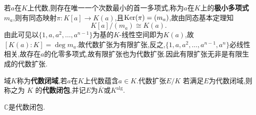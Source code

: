 \begin{definition}\label{def:minimal polynomial}
	若$a$在$K$上代数,则存在唯一一个次数最小的首一多项式,称为$a$在$K$上的\textbf{极小多项式}$m_a$,则有同态映射$\pi:K[a]\to K(a)$,且$\operatorname{\mathrm{Ker}}(\pi)=(m_a)$,故由同态基本定理知
	\[
	K[a]/(m_a)\cong K(a).
	\]
	由此可见以$\{1,a,a^2,\dots,a^{n-1}\}$为基的$K$-线性空间即为$K(a)$,故$[K(a):K]=\deg m_a$.故代数扩张为有限扩张,反之,$\{1,a,a^2,\dots,a^{n-1},a^n\}$必线性相关,故存在$a$的化零多项式,故有限扩张也为代数扩张.因此有限扩张无非是有限生成的代数扩张.
\end{definition}
\begin{definition}
	域$K$称为\textbf{代数闭域},若$a$在$K$上代数蕴含$a\in K$.代数扩张$E/K$ 若满足$E$为代数闭域,则称之为 $K$ 的\textbf{代数闭包},并记$E$为$\overline{K}$或$K^{\text{alg}}$.
\end{definition}
\begin{theorem}[代数基本定理]
	$\mathbb{C}$是代数闭包.
\end{theorem}

